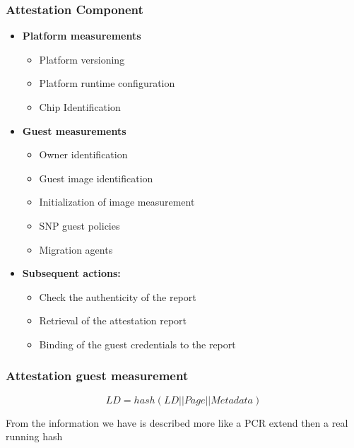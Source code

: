 \subsubsection{Attestation Component}

\begin{multicols}{2}
    \begin{itemize}[itemsep=0pt]
        \item \textbf{Platform measurements}
        \begin{itemize}[itemsep=0pt]
            \item Platform versioning
            \item Platform runtime configuration
            \item Chip Identification
        \end{itemize}
        \item \textbf{Guest measurements}
        \begin{itemize}[itemsep=0pt]
            \item Owner identification
            \item Guest image identification
            \item Initialization of image measurement
            \item SNP guest policies
            \item Migration agents
        \end{itemize}
        \item \textbf{Subsequent actions:}
        \begin{itemize}[itemsep=0pt]
            \item Check the authenticity of the report
            \item Retrieval of the attestation report
            \item Binding of the guest credentials to the report
        \end{itemize}
    \end{itemize}
\end{multicols}

\subsubsection{Attestation guest measurement}

$$ LD = hash( LD || Page || Metadata) $$

From the information we have is described more like a PCR extend then a real running hash


